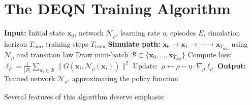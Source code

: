 \documentclass[11pt,a4paper]{report}
\newcommand{\x}{\bm{x}}
\begin{document}
\section{The DEQN Training Algorithm}
\label{sec:deqn_algo}

\begin{definitionbox}
\begin{algorithmic}
\small
\STATE \textbf{Input:} Initial state $\x_0$, network $\mathcal{N}_\rho$, learning rate $\eta$, episodes $E$, simulation horizon $T_{\mathrm{sim}}$, training steps $T_{\mathrm{train}}$
    \STATE \textbf{Simulate path:} $\x_0 \to \x_1 \to \cdots \to \x_{T_{\mathrm{sim}}}$ using $\mathcal{N}_\rho$ and transition law
        \STATE Draw mini-batch $\mathcal{B} \subset \{\x_0, \ldots, \x_{T_{\mathrm{sim}}}\}$
        \STATE Compute loss:~$\ell_\rho = \frac{1}{|\mathcal{B}|}\sum_{\x_i \in \mathcal{B}} \|G(\x_i, \mathcal{N}_\rho(\x_i))\|^2$
        \STATE Update:~$\rho \leftarrow \rho - \eta \cdot \nabla_\rho \ell_\rho$
    \ENDFOR
\ENDFOR
\STATE \textbf{Output:} Trained network $\mathcal{N}_{\rho^\star}$ approximating the policy function
\end{algorithmic}
\end{definitionbox}

Several features of this algorithm deserve emphasis:
\end{document}
